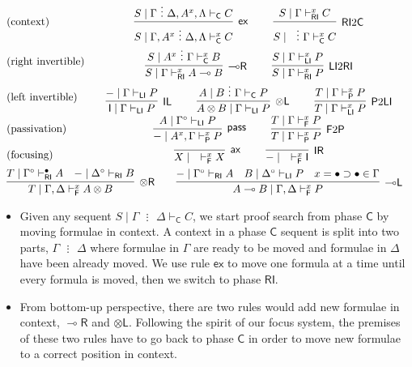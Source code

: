 \documentclass[copyright,creativecommons]{eptcs}
\theoremstyle{definition}
\newcommand{\tl}{\otimes \mathsf{L}}
\newcommand{\tr}{\otimes \mathsf{R}}
\newcommand{\lright}{{\multimap}\mathsf{R}}
\newcommand{\lleft}{{\multimap}\mathsf{L}}
\newcommand{\pass}{\mathsf{pass}}
\newcommand{\unitl}{\mathsf{IL}}
\newcommand{\unitr}{\mathsf{IR}}
\newcommand{\ax}{\mathsf{ax}}
\newcommand{\ot}{\otimes}
\newcommand{\lolli}{\multimap}
\newcommand{\I}{\mathsf{I}}
\newcommand{\C}{\mathsf{C}}
\newcommand{\RI}{\mathsf{RI}}
\newcommand{\LI}{\mathsf{LI}}
\newcommand{\Pass}{\mathsf{P}}
\newcommand{\F}{\mathsf{F}}
\newcommand{\xvdash}{\vdash^{x}}
\newcommand{\ex}{\mathsf{ex}}
\newcommand{\spl}{\text{ } \vdots \text{ }}
\newcommand{\proofbox}[1]{\begin{tabular}{l} #1 \end{tabular}}
\begin{document}
\begin{equation}\label{eq:focus:sym}
  \begin{array}{lc}
    \text{(context)} &
    \proofbox{
      \infer[\ex]{S \mid \Gamma , A^{x} \spl \Delta , \Lambda \vdash^{x}_{\C} C}{
        S \mid \Gamma \spl \Delta , A^{x} , \Lambda \vdash_{\C} C
      }
    \qquad
      \infer[\RI 2 \C]{S \mid \text{ } \spl \Gamma \vdash^{x}_{\C} C}{
        S \mid \Gamma \vdash^{x}_{\RI} C
      }
    }
    \\[10pt]
    \text{(right invertible)} & %
    \proofbox{
      \infer[\lright]{S \mid \Gamma \vdash^{x}_{\RI} A \lolli B}{S \mid A^{x} \spl \Gamma \vdash^{x}_{\C} B}
    \qquad
    \infer[\LI 2 \RI]{S \mid \Gamma \vdash^{x}_{\RI} P}{S \mid \Gamma \vdash^{x}_{\LI} P}
    }
    \\[10pt]
    \text{(left invertible)} & %
    \proofbox{
      \infer[\unitl]{\I \mid \Gamma \vdash_{\LI} P}{{-} \mid \Gamma \vdash_{\LI} P}
    \qquad
    \infer[\tl]{A \ot B \mid \Gamma \vdash_{\LI} P}{A \mid B \spl \Gamma \vdash_{\C} P}
    \qquad
    \infer[\Pass 2 \LI]{T \mid \Gamma \xvdash_{\LI} P}{T \mid \Gamma \xvdash_{\Pass} P}
    }
    \\[10pt]
    \text{(passivation)} &
    \proofbox{
    \infer[\pass]{{-} \mid A^{x} , \Gamma \xvdash_{\Pass} P }{
      A\mid \Gamma^{\circ} \vdash_{\LI} P
    }
    \qquad
    \infer[\F 2 \Pass]{T \mid \Gamma \xvdash_{\Pass} P}{
      T \mid \Gamma \xvdash_{\F} P
    }
    }
    \\[10pt]
    \text{(focusing)} &    %
    \proofbox{\infer[\ax]{X \mid \quad \xvdash_{\F} X}{}
    \qquad
    \infer[\unitr]{{-} \mid \quad \xvdash_{\F} \I}{}
    }
    \\[6pt]
    \multicolumn{2}{c}{
    \infer[\tr]{T \mid \Gamma , \Delta \xvdash_{\F} A \ot B}{
      T \mid \Gamma^{\circ} \vdash^{\bullet}_{\RI} A
      &
      {-} \mid \Delta^{\circ} \vdash_{\RI} B
    }
    \qquad
    \infer[\lleft]{A \lolli B \mid \Gamma , \Delta \xvdash_{\F} P}{
      {-} \mid \Gamma^{\circ} \vdash_{\RI} A
      &
      B \mid \Delta^{\circ} \vdash_{\LI} P
      &
      x = \bullet \supset \bullet \in \Gamma
    }
    }
  \end{array}
\end{equation}
\begin{itemize}
  \item Given any sequent $S \mid \Gamma \spl \Delta \vdash_{\C} C$, we start proof search from phase $\C$ by moving formulae in context. A context in a phase $\C$ sequent is split into two parts, $\Gamma \spl \Delta$ where formulae in $\Gamma$ are ready to be moved and formulae in $\Delta$ have been already moved.
  We use rule $\ex$ to move one formula at a time until every formula is moved, then we switch to phase $\RI$.
  \item From bottom-up perspective, there are two rules would add new formulae in context, $\lright$ and $\tl$.
  Following the spirit of our focus system, the premises of these two rules have to go back to phase $\C$ in order to move new formulae to a correct position in context.
\end{itemize}
\end{document}
